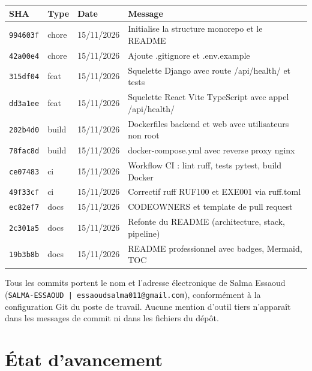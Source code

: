 \documentclass[11pt,a4paper]{article}
\begin{document}
\begin{center}
\renewcommand{\arraystretch}{1.3}
\begin{tabular}{lllp{6.5cm}}
  \toprule
  \textbf{SHA} & \textbf{Type} & \textbf{Date} & \textbf{Message} \\
  \midrule
  \texttt{994603f} & chore & 15/11/2026 & Initialise la structure monorepo et le README \\
  \texttt{42a00e4} & chore & 15/11/2026 & Ajoute .gitignore et .env.example \\
  \texttt{315df04} & feat  & 15/11/2026 & Squelette Django avec route /api/health/ et tests \\
  \texttt{dd3a1ee} & feat  & 15/11/2026 & Squelette React Vite TypeScript avec appel /api/health/ \\
  \texttt{202b4d0} & build & 15/11/2026 & Dockerfiles backend et web avec utilisateurs non root \\
  \texttt{78fac8d} & build & 15/11/2026 & docker-compose.yml avec reverse proxy nginx \\
  \texttt{ce07483} & ci    & 15/11/2026 & Workflow CI : lint ruff, tests pytest, build Docker \\
  \texttt{49f33cf} & ci    & 15/11/2026 & Correctif ruff RUF100 et EXE001 via ruff.toml \\
  \texttt{ec82ef7} & docs  & 15/11/2026 & CODEOWNERS et template de pull request \\
  \texttt{2c301a5} & docs  & 15/11/2026 & Refonte du README (architecture, stack, pipeline) \\
  \texttt{19b3b8b} & docs  & 15/11/2026 & README professionnel avec badges, Mermaid, TOC \\
  \bottomrule
\end{tabular}
\end{center}

Tous les commits portent le nom et l'adresse électronique de Salma Essaoud
(\texttt{SALMA-ESSAOUD | essaoudsalma011@gmail.com}), conformément à la configuration Git
du poste de travail. Aucune mention d'outil tiers n'apparaît dans les messages de commit
ni dans les fichiers du dépôt.

\section{État d'avancement}
\end{document}
